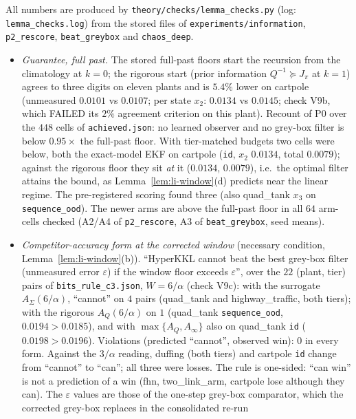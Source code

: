 All numbers are produced by \texttt{theory/checks/lemma\_checks.py} (log: \texttt{lemma\_checks.log}) from the stored
files of \texttt{experiments/information}, \texttt{p2\_rescore}, \texttt{beat\_greybox} and \texttt{chaos\_deep}.
\begin{itemize}[leftmargin=1.5em]
\item \emph{Guarantee, full past.} The stored full-past floors start the recursion from the climatology at $k=0$; the
rigorous start (prior information $Q^{-1}\succeq J_\pi$ at $k=1$) agrees to three digits on eleven plants and is $5.4\%$
lower on cartpole (unmeasured $0.0101$ vs $0.0107$; per state $x_2$: $0.0134$ vs $0.0145$; check V9b, which FAILED its
$2\%$ agreement criterion on this plant). Recount of P0 over the $448$ cells of \texttt{achieved.json}: no learned
observer and no grey-box filter is below $0.95\times$ the full-past floor. With tier-matched budgets two cells were below,
both the exact-model EKF on cartpole (\texttt{id}, $x_2$ $0.0134$, total $0.0079$); against the rigorous floor they sit
\emph{at} it ($0.0134$, $0.0079$), i.e.\ the optimal filter attains the bound, as Lemma~\ref{lem:li-window}(d) predicts near
the linear regime. The pre-registered scoring found three (also quad\_tank $x_3$ on \texttt{sequence\_ood}). The newer
arms are above the full-past floor in all $64$ arm-cells checked (A2/A4 of \texttt{p2\_rescore}, A3 of
\texttt{beat\_greybox}, seed means).
\item \emph{Competitor-accuracy form at the corrected window} (necessary condition, Lemma~\ref{lem:li-window}(b)). ``HyperKKL
cannot beat the best grey-box filter (unmeasured error $\varepsilon$) if the window floor exceeds $\varepsilon$'', over the
$22$ (plant, tier) pairs of \texttt{bits\_rule\_c3.json}, $W=6/\alpha$ (check V9c): with the surrogate $A_\Sigma(6/\alpha)$,
``cannot'' on $4$ pairs (quad\_tank and highway\_traffic, both tiers); with the rigorous $A_Q(6/\alpha)$ on $1$
(quad\_tank \texttt{sequence\_ood}, $0.0194>0.0185$), and with $\max\{A_Q,A_\infty\}$ also on quad\_tank \texttt{id}
($0.0198>0.0196$). Violations (predicted ``cannot'', observed win): $0$ in every form. Against the $3/\alpha$ reading,
duffing (both tiers) and cartpole \texttt{id} change from ``cannot'' to ``can''; all three were losses. The rule is
one-sided: ``can win'' is not a prediction of a win (fhn, two\_link\_arm, cartpole lose although they can). The $\varepsilon$
values are those of the one-step grey-box comparator, which the corrected grey-box replaces in the consolidated re-run

\end{itemize}

